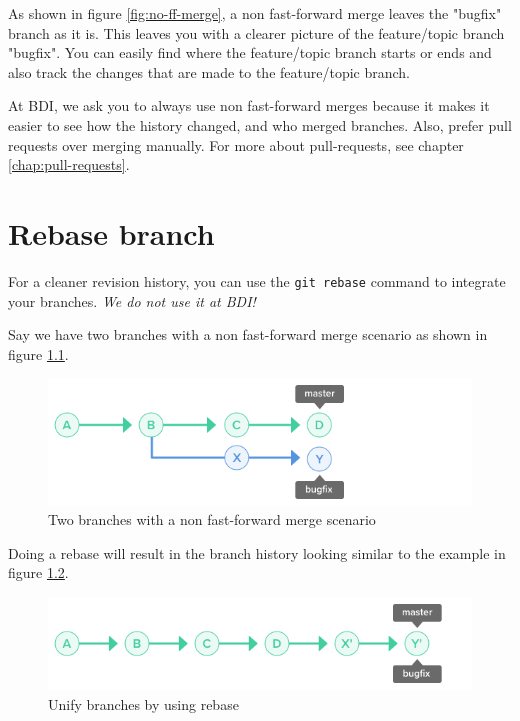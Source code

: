 \documentclass[10pt,a4paper,english]{report}
\begin{document}
    As shown in figure \ref{fig:no-ff-merge}, a non fast-forward merge leaves the "bugfix" branch as it is. This leaves you with a clearer picture of the feature/topic branch "bugfix". You can easily find where the feature/topic branch starts or ends and also track the changes that are made to the feature/topic branch.

    At BDI, we ask you to always use non fast-forward merges because it makes it easier to see how the history changed, and who merged branches. Also, prefer pull requests over merging manually. For more about pull-requests, see chapter \ref{chap:pull-requests}.

\chapter{Rebase branch}

    For a cleaner revision history, you can use the \verb|git rebase| command to integrate your branches. \emph{We do not use it at BDI!}

    Say we have two branches with a non fast-forward merge scenario as shown in figure \ref{fig:non-ff-scenario}.

    \begin{figure}[ht]
    \begin{center}
    \includegraphics[scale=0.5]{images/rebase_branch_001.png}
    \end{center}
    \caption{Two branches with a non fast-forward merge scenario}
    \label{fig:non-ff-scenario}
    \end{figure}

    Doing a rebase will result in the branch history looking similar to the example in figure \ref{fig:unify-branches}.

    \begin{figure}[ht]
    \begin{center}
    \includegraphics[scale=0.5]{images/rebase_branch_002.png}
    \end{center}
    \caption{Unify branches by using rebase}
    \label{fig:unify-branches}
    \end{figure}
\end{document}
